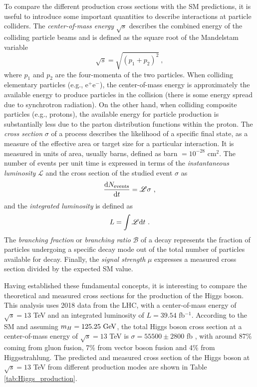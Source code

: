 To compare the different production cross sections with the SM predictions, it is useful to introduce some important quantities to describe interactions at particle colliders. The \textit{center-of-mass energy} $\sqrt{s}$ describes the combined energy of the colliding particle beams and is defined as the square root of the Mandelstam variable
\begin{equation*}
\sqrt{s} = \sqrt{(p_1+p_2)^2}\ ,
\end{equation*}
where $p_1$ and $p_2$ are the four-momenta of the two particles. When colliding elementary particles (e.g., e$^+$e$^-$), the center-of-mass energy is approximately the available energy to produce particles in the collision (there is some energy spread due to synchrotron radiation). On the other hand, when colliding composite particles (e.g., protons), the available energy for particle production is substantially less due to the parton distribution functions within the proton. The \textit{cross section} $\sigma$ of a process describes the likelihood of a specific final state, as a measure of the effective area or target size for a particular interaction. It is measured in units of area, usually barns, defined as barn $= 10^{-28}$ cm$^{2}$. The number of events per unit time is expressed in terms of the \textit{instantaneous luminosity} $\mathscr{L}$ and the cross section of the studied event $\sigma$ as
\begin{equation*}
    \frac{\text{d} N_{\text{events}}}{\text{d} t} = \mathscr{L}\sigma\ ,
\end{equation*}
and the \textit{integrated luminosity} is defined as 
\begin{equation*}
    L = \int\mathscr{L}\d t\ .
\end{equation*}
The \textit{branching fraction} or \textit{branching ratio} $\mathcal{B}$ of a decay represents the fraction of particles undergoing a specific decay mode out of the total number of particles available for decay. Finally, the \textit{signal strength} $\mu$ expresses a measured cross section divided by the expected SM value.

Having established these fundamental concepts, it is interesting to compare the theoretical and measured cross sections for the production of the Higgs boson. This analysis uses 2018 data from the LHC, with a center-of-mass energy of $\sqrt{s} = 13$ TeV and an integrated luminosity of $L=39.54$ fb$^{-1}$. According to the SM and assuming $m_H = 125.25\ \text{GeV}$, the total Higgs boson cross section at a center-of-mass energy of $\sqrt{s} = 13$ TeV is $\sigma = 55500 \pm 2800$ fb \cite{LHCHiggsCrossSectionWorkingGroup:2016ypw}, with around 87\% coming from gluon fusion, 7\% from vector boson fusion and 4\% from Higgsstrahlung. The predicted and measured cross section of the Higgs boson at $\sqrt{s} = 13$ TeV from different production modes are shown in Table \ref{tab:Higgs_production}.

